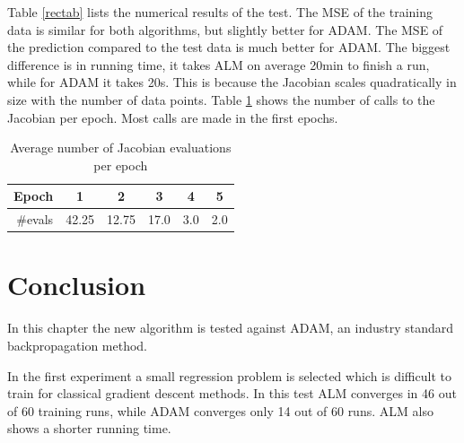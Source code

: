 \FloatBarrier


\begin{table}[h!]
\renewcommand{\arraystretch}{1.3}
\centering
\small
{}
\caption{Results of training a recurrent neural network}
\label{rectab}
\end{table}


Table \ref{rectab} lists the numerical results of the test. The MSE of the training data is similar for both algorithms, but slightly better for ADAM. The MSE of the prediction compared to the test data is much better for ADAM. The biggest difference is in running time, it takes ALM on average 20min to finish a run, while for ADAM it takes 20s. This is because the Jacobian scales quadratically in size with the number of data points. Table \ref{jevaltab} shows the number of calls to the Jacobian per epoch. Most calls are made in the first epochs.

\begin{table}[h!]
\centering
\begin{tabular}{r| c c c c c }
Epoch	 	& 1	& 2 & 3 & 4 & 5 \\ \hline
\#evals & 42.25 & 12.75 & 17.0  &   3.0  &    2.0 \\
\end{tabular}
\caption{Average number of Jacobian evaluations per epoch}
\label{jevaltab}
\end{table}

\section{Conclusion}
In this chapter the new algorithm is tested against ADAM, an industry standard backpropagation method.

In the first experiment a small regression problem is selected which is difficult to train for classical gradient descent methods.  In this test ALM converges in 46 out of 60 training runs, while ADAM converges only 14 out of 60 runs. ALM also shows a shorter running time.

